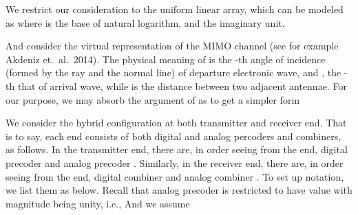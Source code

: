 \startchapter [title={Problem Setting}]

\startsection [title={Channel Model}]

We restrict our consideration to the uniform linear array, which can be modeled as
where  is the base of natural logarithm, and  the imaginary unit.

And consider the virtual representation of the MIMO channel (see for example Akdeniz et.\ al.\ 2014).
The physical meaning of  is the -th angle of incidence (formed by the ray and the normal line) of departure electronic wave, and , the -th that of arrival wave, while  is the distance between two adjacent antennae.
For our purpose, we may absorb the argument of  as
to get a simpler form

\stopsection

\startsection [title={System Model}]

We consider the hybrid configuration at both transmitter and receiver end.
That is to say, each end consists of both digital and analog percoders and combiners, as follows.
In the transmitter end, there are, in order seeing from the end, digital precoder  and analog precoder .
Similarly, in the receiver end, there are, in order seeing from the end, digital combiner  and analog combiner .
To set up notation, we list them as below.
Recall that analog precoder is restricted to have value with magnitude being unity, i.e.,
And we assume


